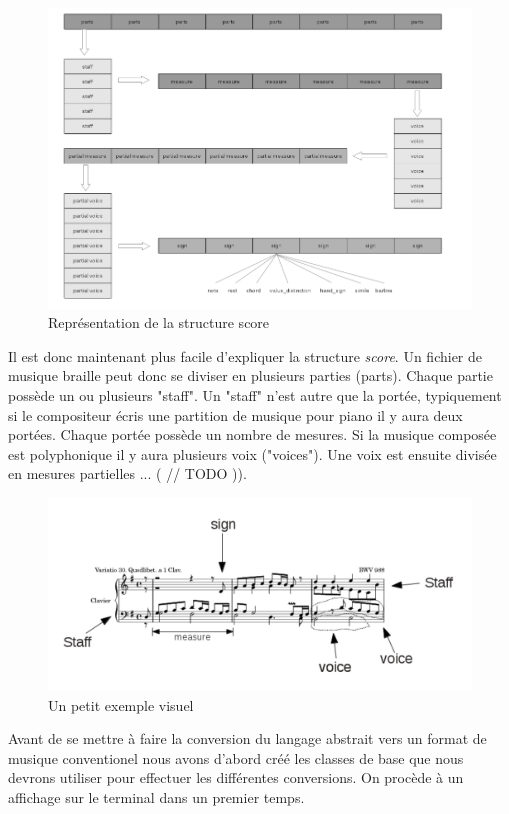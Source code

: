 \begin{figure}[!h]
  \includegraphics[scale=0.8]{images/bmc-score.png}
  \caption{Représentation de la structure score}
\end{figure}

Il est donc maintenant plus facile d'expliquer la structure \textit{score}. Un fichier de musique braille peut donc se diviser en plusieurs parties (parts). Chaque partie possède un ou plusieurs "staff". Un "staff" n'est autre que la portée, typiquement si le compositeur écris une partition de musique pour piano il y aura deux portées. Chaque portée possède un nombre de mesures. Si la musique composée est polyphonique il y aura plusieurs voix ("voices"). Une voix est ensuite divisée en mesures partielles ... ( // TODO )).


\begin{figure}[!h]
  \includegraphics[scale=0.4]{images/score-visu.png}
  \caption{Un petit exemple visuel}
\end{figure}

Avant de se mettre à faire la conversion du langage abstrait vers un format de musique conventionel nous avons d'abord créé les classes de base que nous devrons utiliser pour effectuer les différentes conversions. On procède à un affichage sur le terminal dans un premier temps.

